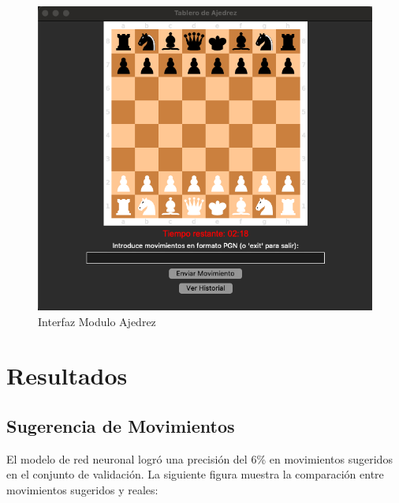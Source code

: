 \documentclass[a4paper,12pt]{article}
\begin{document}
\vspace{10pt} %
\begin{figure}[H]
    \centering
    \includegraphics[width=\textwidth]{../images/Interfaz.png}
    \caption{Interfaz Modulo Ajedrez}
    \label{fig:Interfaz_Modulo_Ajedrez}
\end{figure}


\newpage
\section{Resultados}

\subsection{Sugerencia de Movimientos}

El modelo de red neuronal logró una precisión del 6\% en movimientos sugeridos en el conjunto de validación. La siguiente figura muestra la comparación entre movimientos sugeridos y reales:

\vspace{10pt} %
\end{document}
